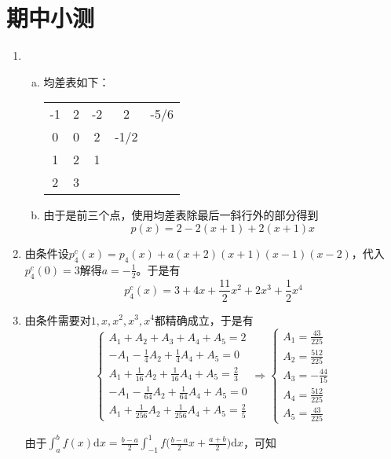 \documentclass[a4paper,UTF8,fontset=windows]{ctexart}
\begin{document}
\section{期中小测}
\begin{enumerate}
    \item
    \begin{enumerate}[(a)]
        \item 
        均差表如下：
    
        \begin{tabular}{cc|ccc}
            -1 & 2 & -2 &    2 & -5/6 \\
             0 & 0 &  2 & -1/2 \\
             1 & 2 &  1 \\
             2 & 3 & \\
        \end{tabular}
    
        \item
        由于是前三个点，使用均差表除最后一斜行外的部分得到
        $$p(x)=2-2(x+1)+2(x+1)x$$
    \end{enumerate}
    
    \item
    由条件设$p_4^c(x)=p_4(x)+a(x+2)(x+1)(x-1)(x-2)$，代入$p_4^c(0)=3$解得$a=-\frac{1}{2}$。于是有
    $$p_4^c(x)=3+4x+\frac{11}{2}x^2+2x^3+\frac{1}{2}x^4$$
    
    \item
    由条件需要对$1,x,x^2,x^3,x^4$都精确成立，于是有
    $$\begin{cases}A_1+A_2+A_3+A_4+A_5=2\\-A_1-\frac{1}{4}A_2+\frac{1}{4}A_4+A_5=0\\A_1+\frac{1}{16}A_2+\frac{1}{16}A_4+A_5=\frac{2}{3}\\-A_1-\frac{1}{64}A_2+\frac{1}{64}A_4+A_5=0\\A_1+\frac{1}{256}A_2+\frac{1}{256}A_4+A_5=\frac{2}{5}\end{cases}\Rightarrow\begin{cases}A_1=\frac{43}{225}\\A_2=\frac{512}{225}\\A_3=-\frac{44}{15}\\A_4=\frac{512}{225}\\A_5=\frac{43}{225}\end{cases}$$
    
    由于$\int_a^bf(x)\mathrm{d}x=\frac{b-a}{2}\int_{-1}^1f\big(\frac{b-a}{2}x+\frac{a+b}{2}\big)\mathrm{d}x$，可知
    

\end{enumerate}
\end{document}
